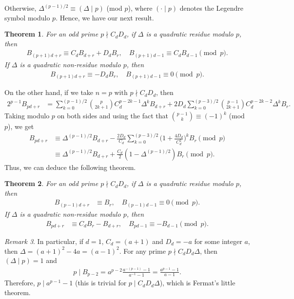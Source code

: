 \documentclass[12pt]{article}
\theoremstyle{plain}
\newtheorem{theorem}{Theorem}
\theoremstyle{definition}
\theoremstyle{remark}
\newtheorem{remark}[theorem]{Remark}
\begin{document}
Otherwise, $ \Delta^{(p - 1)/2} \equiv (\Delta \mid p) $ (mod $ p $), where $ (\cdot \mid p) $ denotes the Legendre symbol modulo $ p $. Hence, we have our next result. 
\begin{theorem} \label{Th:Divisibility_p+1} For an odd prime $ p \nmid C_d D_d $, if $ \Delta $ is a quadratic residue modulo $ p $, then
\begin{align*}
	B_{(p + 1)d + r} \equiv C_d B_{d + r} + D_d B_r, \quad B_{(p + 1)d - 1} \equiv C_d B_{d - 1} \pmod{p}.
\end{align*}	
If $ \Delta $ is a quadratic non-residue modulo $ p $, then
\begin{align*}
	B_{(p + 1)d + r} \equiv -D_d B_r, \quad B_{(p + 1)d - 1} \equiv 0 \pmod{p}.
\end{align*}
\end{theorem}

On the other hand, if we take $ n = p $ with $ p \nmid C_d D_d $, then
\begin{align*}
	2^{p - 1} B_{pd + r} &= \sum_{k = 0}^{(p - 1)/2} \binom{p}{2k + 1} C_d^{p - 2k - 1} \Delta^k B_{d + r} + 2D_d \sum_{k = 0}^{(p - 3)/2} \binom{p - 1}{2k + 1} C_d^{p - 2k - 2} \Delta^k B_r.
\end{align*}
Taking modulo $ p $ on both sides and using the fact that $ \binom{p - 1}{k} \equiv (-1)^k $ (mod $ p $), we get
\begin{align*}
	B_{pd + r} &\equiv \Delta^{(p - 1)/2} B_{d + r} - \frac{2D_d}{C_d} \sum_{k = 0}^{(p - 3)/2} \bigg( 1 + \frac{4D_d}{C_d^2} \bigg)^k B_r \pmod{p} \\
	&\equiv \Delta^{(p - 1)/2} B_{d + r} + \frac{C_d}{2} (1 - \Delta^{(p - 1)/2}) B_r \pmod{p}.
\end{align*}
Thus, we can deduce the following theorem.
\begin{theorem} \label{Th:Divisibility_p} For an odd prime $ p \nmid C_d D_d $, if $ \Delta $ is a quadratic residue modulo $ p $, then
\begin{align*}
	B_{(p - 1)d + r} &\equiv B_r, \quad B_{(p - 1)d - 1} \equiv 0 \pmod{p}.
\end{align*}
If $ \Delta $ is a quadratic non-residue modulo $ p $, then
\begin{align*}
	B_{pd + r} &\equiv C_d B_r - B_{d + r}, \quad B_{pd - 1} \equiv -B_{d - 1} \pmod{p}.
\end{align*}
\end{theorem}

\begin{remark} In particular, if $ d = 1 $, $ C_d = (a + 1) $ and $ D_d = -a $ for some integer $ a $, then $ \Delta = (a + 1)^2 - 4a = (a - 1)^2 $. For any prime $ p \nmid C_d D_d \Delta $, then $ (\Delta \mid p) = 1 $ and
\begin{align*}
	p \mid B_{p - 2} = a^{p - 2} \frac{a^{-(p - 1)} - 1}{a^{-1} - 1} = \frac{a^{p - 1} - 1}{a - 1}.
\end{align*}
Therefore, $ p \mid a^{p - 1} - 1 $ (this is trivial for $ p \mid C_d D_d \Delta $), which is Fermat's little theorem.
\end{remark}
\end{document}
